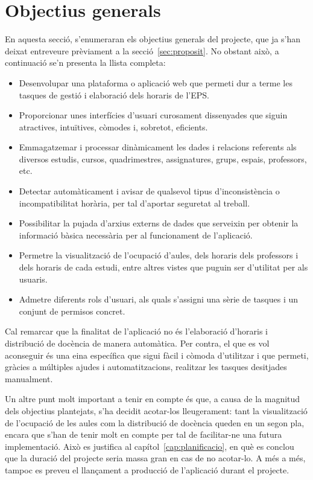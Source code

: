 \documentclass[a4paper,12pt]{ThesisStyle}
\begin{document}
\section{Objectius generals}
\label{sec:objectius_generals}

En aquesta secció, s'enumeraran els objectius generals del projecte, que ja s'han deixat entreveure prèviament a la secció~\ref{sec:proposit}. No obstant això, a continuació se'n presenta la llista completa:
\begin{itemize}
  \item Desenvolupar una plataforma o aplicació web que permeti dur a terme les tasques de gestió i elaboració dels horaris de l'EPS.
  \item Proporcionar unes interfícies d'usuari curosament dissenyades que siguin atractives, intuïtives, còmodes i, sobretot, eficients.
  \item Emmagatzemar i processar dinàmicament les dades i relacions referents als diversos estudis, cursos, quadrimestres, assignatures, grups, espais, professors, etc.
  \item Detectar automàticament i avisar de qualsevol tipus d'inconsistència o incompatibilitat horària, per tal d'aportar seguretat al treball.
  \item Possibilitar la pujada d'arxius externs de dades que serveixin per obtenir la informació bàsica necessària per al funcionament de l'aplicació.
  \item Permetre la visualització de l'ocupació d'aules, dels horaris dels professors i dels horaris de cada estudi, entre altres vistes que puguin ser d'utilitat per als usuaris.
  \item Admetre diferents rols d'usuari, als quals s'assigni una sèrie de tasques i un conjunt de permisos concret.
\end{itemize}

Cal remarcar que la finalitat de l'aplicació no és l'elaboració d'horaris i distribució de docència de manera automàtica. Per contra, el que es vol aconseguir és una eina específica que sigui fàcil i còmoda d'utilitzar i que permeti, gràcies a múltiples ajudes i automatitzacions, realitzar les tasques desitjades manualment.

Un altre punt molt important a tenir en compte és que, a causa de la magnitud dels objectius plantejats, s'ha decidit acotar-los lleugerament: tant la visualització de l'ocupació de les aules com la distribució de docència queden en un segon pla, encara que s'han de tenir molt en compte per tal de facilitar-ne una futura implementació. Això es justifica al capítol~\ref{cap:planificacio}, en què es conclou que la duració del projecte seria massa gran en cas de no acotar-lo. A més a més, tampoc es preveu el llançament a producció de l'aplicació durant el projecte.
\end{document}
